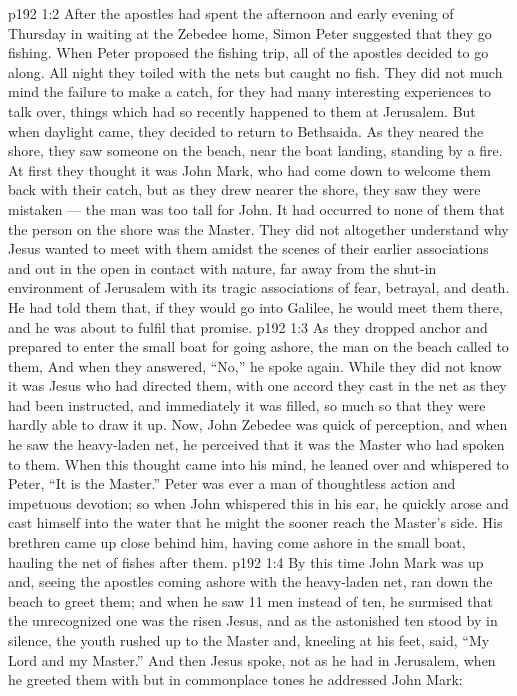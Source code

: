\vs p192 1:2 After the apostles had spent the afternoon and early evening of Thursday in waiting at the Zebedee home, Simon Peter suggested that they go fishing. When Peter proposed the fishing trip, all of the apostles decided to go along. All night they toiled with the nets but caught no fish. They did not much mind the failure to make a catch, for they had many interesting experiences to talk over, things which had so recently happened to them at Jerusalem. But when daylight came, they decided to return to Bethsaida. As they neared the shore, they saw someone on the beach, near the boat landing, standing by a fire. At first they thought it was John Mark, who had come down to welcome them back with their catch, but as they drew nearer the shore, they saw they were mistaken --- the man was too tall for John. It had occurred to none of them that the person on the shore was the Master. They did not altogether understand why Jesus wanted to meet with them amidst the scenes of their earlier associations and out in the open in contact with nature, far away from the shut\hyp{}in environment of Jerusalem with its tragic associations of fear, betrayal, and death. He had told them that, if they would go into Galilee, he would meet them there, and he was about to fulfil that promise.
\vs p192 1:3 As they dropped anchor and prepared to enter the small boat for going ashore, the man on the beach called to them,  And when they answered, “No,” he spoke again.  While they did not know it was Jesus who had directed them, with one accord they cast in the net as they had been instructed, and immediately it was filled, so much so that they were hardly able to draw it up. Now, John Zebedee was quick of perception, and when he saw the heavy\hyp{}laden net, he perceived that it was the Master who had spoken to them. When this thought came into his mind, he leaned over and whispered to Peter, “It is the Master.” Peter was ever a man of thoughtless action and impetuous devotion; so when John whispered this in his ear, he quickly arose and cast himself into the water that he might the sooner reach the Master’s side. His brethren came up close behind him, having come ashore in the small boat, hauling the net of fishes after them.
\vs p192 1:4 By this time John Mark was up and, seeing the apostles coming ashore with the heavy\hyp{}laden net, ran down the beach to greet them; and when he saw 11 men instead of ten, he surmised that the unrecognized one was the risen Jesus, and as the astonished ten stood by in silence, the youth rushed up to the Master and, kneeling at his feet, said, “My Lord and my Master.” And then Jesus spoke, not as he had in Jerusalem, when he greeted them with  but in commonplace tones he addressed John Mark: 
